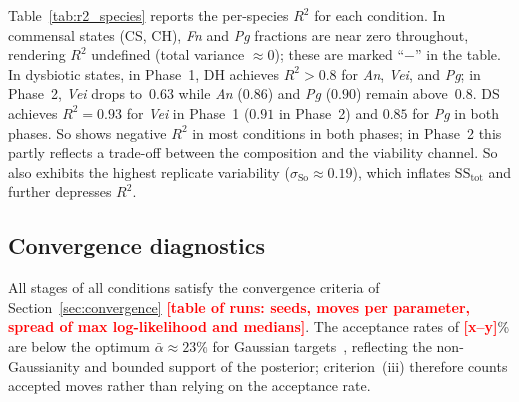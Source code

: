 \documentclass[pdflatex,sn-mathphys-ay,lineno]{sn-jnl}%
\newcommand{\TBD}[1]{\textcolor{red}{\textbf{[#1]}}}
\begin{document}
\begin{table}[htbp]
\centering\footnotesize\setlength{\tabcolsep}{3pt}

\caption{Composition fit at the end of Phase~1 (stage (ii), composition likelihood only) and Phase~2 (stage (iv), with the viability channel).
RMSE and MAE refer to the species composition in both phases.
$\bar{\alpha}$: mean MH acceptance rate.
$\max\ln\mathcal{L}$ and $\ln\hat{Z}$ are not comparable across phases (Phase~2 includes additional channels) nor across conditions (different data); use RMSE for comparison.}
\label{tab:rmse}
\end{table}

Table~\ref{tab:r2_species} reports the per-species $R^2$ for each condition.
In commensal states (CS, CH), \textit{Fn} and \textit{Pg} fractions are near zero throughout, rendering $R^2$ undefined (total variance $\approx0$); these are marked ``$-$'' in the table.
In dysbiotic states, in Phase~1, DH achieves $R^2>0.8$ for \textit{An}, \textit{Vei}, and \textit{Pg}; in Phase~2, \textit{Vei} drops to~$0.63$ while \textit{An} ($0.86$) and \textit{Pg} ($0.90$) remain above~$0.8$.
DS achieves $R^2=0.93$ for \textit{Vei} in Phase~1 ($0.91$ in Phase~2) and $0.85$ for \textit{Pg} in both phases.
So shows negative $R^2$ in most conditions in both phases; in Phase~2 this partly reflects a trade-off between the composition and the viability channel.
So also exhibits the highest replicate variability ($\sigma_{\mathrm{So}}\approx0.19$), which inflates $\mathrm{SS}_{\mathrm{tot}}$ and further depresses $R^2$.

\begin{table}[htbp]
\centering\footnotesize\setlength{\tabcolsep}{3pt}

\caption{Per-species $R^2$ of the composition for Phase~1 and Phase~2.
``$-$'': species fraction $<0.02$ at all time points ($\mathrm{SS}_{\mathrm{tot}}\approx0$), rendering $R^2$ ill-defined; the MAP prediction for these species is $<0.01$ with absolute error below the observation noise~$\sigma_i$.
Bold: $R^2>0.8$.
DS maintains $R^2\geq0.85$ for Vei and Pg in both phases; DH reproduces the Pg time course ($R^2=0.90$) in Phase~2.}
\label{tab:r2_species}
\end{table}

\subsection{Convergence diagnostics}

All stages of all conditions satisfy the convergence criteria of Section~\ref{sec:convergence} \TBD{table of runs: seeds, moves per parameter, spread of max log-likelihood and medians}.
The acceptance rates of \TBD{x--y}\% are below the optimum $\bar\alpha\approx23\%$ for Gaussian targets~\citep{RobertsRosenthal2001Optimal}, reflecting the non-Gaussianity and bounded support of the posterior; criterion~(iii) therefore counts accepted moves rather than relying on the acceptance rate.
\end{document}
